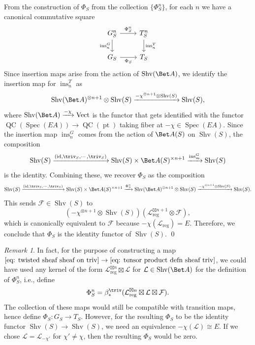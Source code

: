 \documentclass[10pt]{amsart}
\theoremstyle{remark}
\newtheorem{rmk}[subsubsection]{Remark}
\newcommand{\on}{\operatorname}
\newcommand{\cF}{\mathcal{F}}
\newcommand{\cL}{\mathcal{L}}
\newcommand{\Vect}{\on{Vect}}
\newcommand{\QC}{\on{QC}}
\newcommand{\Shv}{\on{Shv}}
\newcommand{\id}{\on{id}}
\newcommand{\pt}{\on{pt}}
\begin{document}
 From the construction of $\Phi_S$ from the collection $\{\Phi^n_S\}$, for each $n$ we have a canonical commutative square
\[\begin{tikzcd}
	{G^n_S} & {T^n_S} \\
	{G_S} & {T_S}
	\arrow["{\Phi^n_S}", from=1-1, to=1-2]
	\arrow["{\on{ins}^G_n}"', from=1-1, to=2-1]
	\arrow["{\on{ins}^T_n}", from=1-2, to=2-2]
	\arrow["{\Phi_S}"', from=2-1, to=2-2]
\end{tikzcd}\]
 Since insertion maps arise from the action of $\Shv(\Bet A)$, we identify the insertion map for $\on{ins}^T_n$ as
\[\Shv(\Bet A)^{\otimes n+1}\otimes \Shv(S)\xrightarrow{-\chi^{\otimes n+1}\otimes \Shv(S)}\Shv(S),\]
where $\Shv(\Bet A)\xrightarrow{-\chi}\Vect$ is the functor that gets identified with the functor $\QC(\on{Spec}(EA))\rightarrow \QC(\pt)$ taking fiber at $-\chi \in \on{Spec}(EA)$. 
Since the insertion map $\on{ins}^G_n$ comes from the action of $\Bet A(S)$ on $\Shv(S)$, the composition
\[\Shv(S)\xrightarrow{(\id,\triv_S,\cdots,\triv_S)} \Shv(S)\times \Bet A(S)^{\times n+1} \xrightarrow{\on{ins}^G_m}\Shv(S)\]
is the identity. Combining these, we recover $\Phi_S$ as the composition
\[\Shv(S)\xrightarrow{(\id,\triv_S,\cdots,\triv_S)} \Shv(S)\times \Bet A(S)^{\times n+1}\xrightarrow{\Phi^n_S}\Shv(\Bet A)^{\otimes n+1}\otimes \Shv(S)\xrightarrow{-\chi^{\otimes n+1}\otimes \Shv(S)}\Shv(S).\]
This sends $\cF\in\Shv(S)$ to
\[(-\chi^{\otimes n+1}\otimes \Shv(S))(\cL^{\boxtimes n+1}_{\on{reg}}\otimes \cF),\]
which is canonically equivalent to $\cF$ because $-\chi(\cL_{\on{reg}})=E$. Therefore, we conclude that $\Phi_S$ is the identity functor of $\Shv(S)$. \qed

\begin{rmk}
    In fact, for the purpose of constructing a map $\eqref{eq: twisted sheaf sheaf on triv}\rightarrow \eqref{eq: tensor product defn sheaf triv}$, we could have used   
    any kernel of the form $\cL^{\boxtimes n}_{\on{reg}}\boxtimes \cL$ for $\cL\in\Shv(\Bet A)$ for the definition of $\Phi^n_S$, i.e., define
    \[\Phi^n_S=\beta^{\triv}_*(\cL_{\on{reg}}^{\boxtimes n}\boxtimes \cL\boxtimes \cF).\]
    The collection of these maps would still be compatible with transition maps, hence define $\Phi_S:G_S\rightarrow T_S$.  
    However, for the resulting $\Phi_S$ to be the identity functor $\Shv(S)\rightarrow \Shv(S)$, we need an equivalence $-\chi(\cL)\cong E$. If we chose $\cL=\cL_{-\chi'}$ for $\chi'\ne \chi$, then the resulting $\Phi_S$ would be zero.
\end{rmk}
\end{document}
